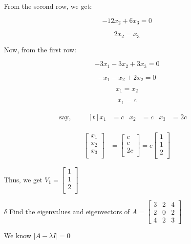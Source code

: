 \documentclass{article}
\begin{document}
From the second row, we get:

\[ -12x_2 +6x_3 = 0 \]

\[ 2x_2 = x_3  \]


Now, from the first row:

\[ -3x_1 - 3x_2 + 3x_3 = 0 \]

\[ -x_1 - x_2 + 2x_2 = 0 \]

\[ x_1 = x_2 \]

\[ x_1 = c \]

\begin{align*}
    \text{say, } \quad & \begin{aligned}[t]
        x_1 &= c &
        x_2 &= c &
        x_3 &= 2c &
    \end{aligned}
\end{align*}

\begin{align*}
    \begin{bmatrix}
        x_1 \\
        x_2 \\
        x_3 \\
    \end{bmatrix}
    &= \begin{bmatrix}
        c \\
        c \\
        2c \\
    \end{bmatrix}
    = c\begin{bmatrix}
        1 \\
        1 \\
        2 \\
    \end{bmatrix}
\end{align*}

Thus, we get \( V_1 = 
\begin{bmatrix}
    1 \\
    1 \\
    2 \\
\end{bmatrix} \)

\newpage

$\delta$ Find the eigenvalues and eigenvectors of \(A = \begin{bmatrix} 3 & 2 & 4 \\ 2 & 0 & 2 \\ 4 & 2 & 3 \end{bmatrix}\)

We know \(|A - \lambda I| = 0\)
\end{document}
